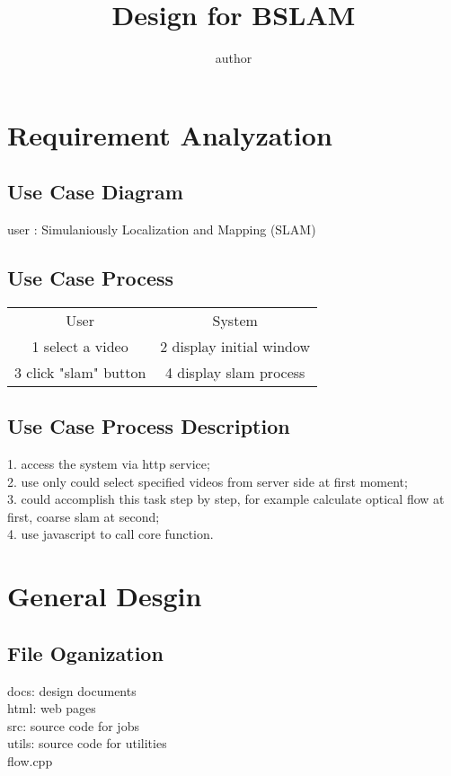 \documentclass{article}
\title { Design for BSLAM }
\author{author}
\begin{document}
\maketitle


\section{Requirement Analyzation}

\subsection{Use Case Diagram}

user : Simulaniously Localization and Mapping (SLAM)

\subsection{Use Case Process}

\begin{tabular}{c c}

User&System\\
1 select a video & 2 display initial window\\
3 click "slam" button & 4 display slam process\\
\end{tabular}

\subsection{Use Case Process Description}
1. access the system via http service;\\
2. use only could select specified videos from server side at first moment;\\
3. could accomplish this task step by step, for example calculate optical flow at first, coarse slam at second;\\
4. use javascript to call core function.

\section{General Desgin}

\subsection{File Oganization}
docs: design documents\\
html: web pages\\
src: source code for jobs\\
utils: source code for utilities\\
\indent flow.cpp
\end{document}
